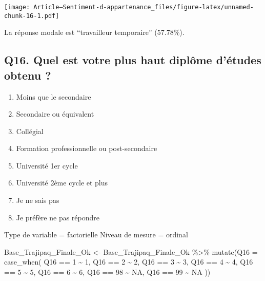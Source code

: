 \documentclass[
]{article}
\newenvironment{Shaded}{\begin{snugshade}}{\end{snugshade}}
\newcommand{\AttributeTok}[1]{\textcolor[rgb]{0.77,0.63,0.00}{#1}}
\newcommand{\ConstantTok}[1]{\textcolor[rgb]{0.00,0.00,0.00}{#1}}
\newcommand{\DecValTok}[1]{\textcolor[rgb]{0.00,0.00,0.81}{#1}}
\newcommand{\FunctionTok}[1]{\textcolor[rgb]{0.00,0.00,0.00}{#1}}
\newcommand{\NormalTok}[1]{#1}
\newcommand{\OtherTok}[1]{\textcolor[rgb]{0.56,0.35,0.01}{#1}}
\newcommand{\SpecialCharTok}[1]{\textcolor[rgb]{0.00,0.00,0.00}{#1}}
\providecommand{\tightlist}{%
  \setlength{\itemsep}{0pt}\setlength{\parskip}{0pt}}
\begin{document}
\texttt{[image: Article---Sentiment-d-appartenance\_files/figure-latex/unnamed-chunk-16-1.pdf]}

La réponse modale est ``travailleur temporaire'' (57.78\%).

\hypertarget{q16.-quel-est-votre-plus-haut-dipluxf4me-duxe9tudes-obtenu}{%
\subsection{Q16. Quel est votre plus haut diplôme d'études obtenu
?}\label{q16.-quel-est-votre-plus-haut-dipluxf4me-duxe9tudes-obtenu}}

\begin{enumerate}
\def\labelenumi{\arabic{enumi}.}
\tightlist
\item
  Moins que le secondaire
\item
  Secondaire ou équivalent
\item
  Collégial
\item
  Formation professionnelle ou post-secondaire
\item
  Université 1er cycle
\item
  Université 2ème cycle et plus
\item
  Je ne sais pas
\item
  Je préfère ne pas répondre
\end{enumerate}

Type de variable = factorielle Niveau de mesure = ordinal

\begin{Shaded}
\begin{Highlighting}[]
\NormalTok{Base\_Trajipaq\_Finale\_Ok }\OtherTok{\textless{}{-}}
\NormalTok{  Base\_Trajipaq\_Finale\_Ok }\SpecialCharTok{\%\textgreater{}\%}
  \FunctionTok{mutate}\NormalTok{(}\AttributeTok{Q16 =} \FunctionTok{case\_when}\NormalTok{(}
\NormalTok{    Q16 }\SpecialCharTok{==} \DecValTok{1} \SpecialCharTok{\textasciitilde{}} \DecValTok{1}\NormalTok{,}
\NormalTok{    Q16 }\SpecialCharTok{==} \DecValTok{2} \SpecialCharTok{\textasciitilde{}} \DecValTok{2}\NormalTok{,}
\NormalTok{    Q16 }\SpecialCharTok{==} \DecValTok{3} \SpecialCharTok{\textasciitilde{}} \DecValTok{3}\NormalTok{,}
\NormalTok{    Q16 }\SpecialCharTok{==} \DecValTok{4} \SpecialCharTok{\textasciitilde{}} \DecValTok{4}\NormalTok{,}
\NormalTok{    Q16 }\SpecialCharTok{==} \DecValTok{5} \SpecialCharTok{\textasciitilde{}} \DecValTok{5}\NormalTok{,}
\NormalTok{    Q16 }\SpecialCharTok{==} \DecValTok{6} \SpecialCharTok{\textasciitilde{}} \DecValTok{6}\NormalTok{,}
\NormalTok{    Q16 }\SpecialCharTok{==} \DecValTok{98} \SpecialCharTok{\textasciitilde{}} \ConstantTok{NA}\NormalTok{,}
\NormalTok{    Q16 }\SpecialCharTok{==} \DecValTok{99} \SpecialCharTok{\textasciitilde{}} \ConstantTok{NA}
\NormalTok{  ))}
\end{Highlighting}
\end{Shaded}
\end{document}
